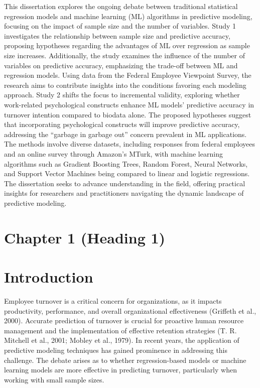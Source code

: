 \documentclass[
  man]{apa7}
\begin{document}
This dissertation explores the ongoing debate between traditional statistical regression models and machine learning (ML) algorithms in predictive modeling, focusing on the impact of sample size and the number of variables. Study 1 investigates the relationship between sample size and predictive accuracy, proposing hypotheses regarding the advantages of ML over regression as sample size increases. Additionally, the study examines the influence of the number of variables on predictive accuracy, emphasizing the trade-off between ML and regression models. Using data from the Federal Employee Viewpoint Survey, the research aims to contribute insights into the conditions favoring each modeling approach. Study 2 shifts the focus to incremental validity, exploring whether work-related psychological constructs enhance ML models' predictive accuracy in turnover intention compared to biodata alone. The proposed hypotheses suggest that incorporating psychological constructs will improve predictive accuracy, addressing the ``garbage in garbage out'' concern prevalent in ML applications. The methods involve diverse datasets, including responses from federal employees and an online survey through Amazon's MTurk, with machine learning algorithms such as Gradient Boosting Trees, Random Forest, Neural Networks, and Support Vector Machines being compared to linear and logistic regressions. The dissertation seeks to advance understanding in the field, offering practical insights for researchers and practitioners navigating the dynamic landscape of predictive modeling.

\newpage
{}
\renewcommand{\headrulewidth}{0pt}
\renewcommand{\footrulewidth}{0pt}

\tableofcontents

\section{Chapter 1 (Heading 1)}
\newpage

\hypertarget{introduction}{%
\section{Introduction}\label{introduction}}

Employee turnover is a critical concern for organizations, as it impacts productivity, performance, and overall organizational effectiveness (Griffeth et al., 2000).
Accurate prediction of turnover is crucial for proactive human resource management and the implementation of effective retention strategies (T. R. Mitchell et al., 2001; Mobley et al., 1979).
In recent years, the application of predictive modeling techniques has gained prominence in addressing this challenge.
The debate arises as to whether regression-based models or machine learning models are more effective in predicting turnover, particularly when working with small sample sizes.
\end{document}

